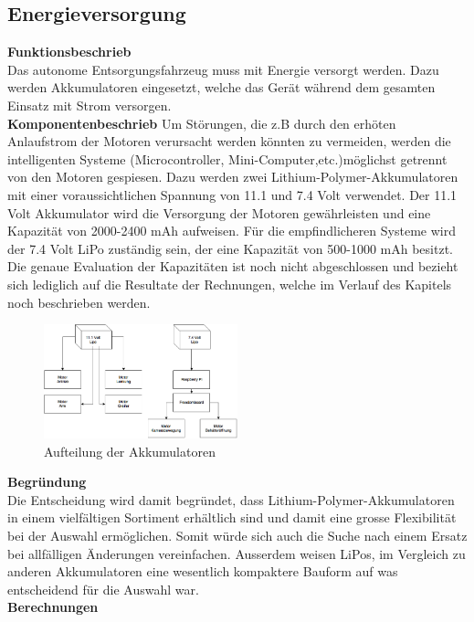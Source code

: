 \subsection{Energieversorgung}

\textbf{Funktionsbeschrieb}\\[0.2cm]
Das autonome Entsorgungsfahrzeug muss mit Energie versorgt werden. Dazu werden Akkumulatoren eingesetzt, welche das Gerät während dem gesamten Einsatz mit Strom versorgen. 
\\[0.2cm]
\textbf{Komponentenbeschrieb}
Um Störungen, die z.B durch den erhöten Anlaufstrom der Motoren verursacht werden könnten zu vermeiden, werden die intelligenten Systeme (Microcontroller, Mini-Computer,etc.)möglichst getrennt von den Motoren gespiesen. Dazu werden zwei Lithium-Polymer-Akkumulatoren mit einer voraussichtlichen Spannung von 11.1 und 7.4 Volt verwendet.
Der 11.1 Volt Akkumulator wird die Versorgung der Motoren gewährleisten und eine Kapazität von 2000-2400 mAh aufweisen. Für die empfindlicheren Systeme wird der 7.4 Volt LiPo zuständig sein, der eine Kapazität von 500-1000 mAh besitzt.
Die genaue Evaluation der Kapazitäten ist noch nicht abgeschlossen und bezieht sich lediglich auf die Resultate der Rechnungen, welche im Verlauf des Kapitels noch beschrieben werden.
\begin{figure}[h]
\centering
\includegraphics[width=0.5\textwidth]{03_Loesungskonzept/pictures/speisung.png}
\caption{Aufteilung der Akkumulatoren}	
\end{figure}
\textbf{Begründung}\\[0.2cm]
Die Entscheidung wird damit begründet, dass Lithium-Polymer-Akkumulatoren in einem vielfältigen Sortiment erhältlich sind und damit eine grosse Flexibilität bei der Auswahl ermöglichen. Somit würde sich auch die Suche nach einem Ersatz bei allfälligen Änderungen vereinfachen. Ausserdem weisen LiPos, im Vergleich zu anderen Akkumulatoren eine wesentlich kompaktere Bauform auf was entscheidend für die Auswahl war. \\[0.2cm]
\textbf{Berechnungen}\\[0.2cm]
